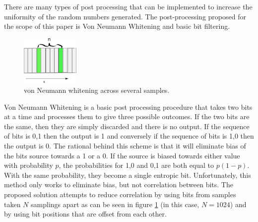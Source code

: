 

There are many types of post processing that can be implemented to increase the
uniformity of the random numbers generated. The post-processing proposed for the
scope of this paper is Von Neumann Whitening \cite{vn_whitening} and basic bit
filtering. 

\begin{figure}
	\centering
	\includegraphics[width=0.25\textwidth]{vn_whitening.png}
	\caption{von Neumann whitening across several samples.}
	\label{fig:vnw}
\end{figure}

Von Neumann Whitening is a basic post processing procedure that takes two bits
at a time and processes them to give three possible outcomes. If the two bits
are the same, then they are simply discarded and there is no output. If the
sequence of bits is 0,1 then the output is 1 and conversely if the sequence of
bits is 1,0 then the output is 0. The rational behind this scheme is that it
will eliminate bias of the bits source towards a 1 or a 0. If the source is
biased towards either value with probability $p$, the probabilities for 1,0 and
0,1 are both equal to $p(1-p)$. With the same probability, they become a single
entropic bit. Unfortunately, this method only works to eliminate bias, but not
correlation between bits. The proposed solution attempts to reduce correlation
by using bits from samples taken $N$ samplings apart as can be seen in figure
\ref{fig:vnw} (in this case, $N = 1024$) and by using bit positions that are
offset from each other. 

